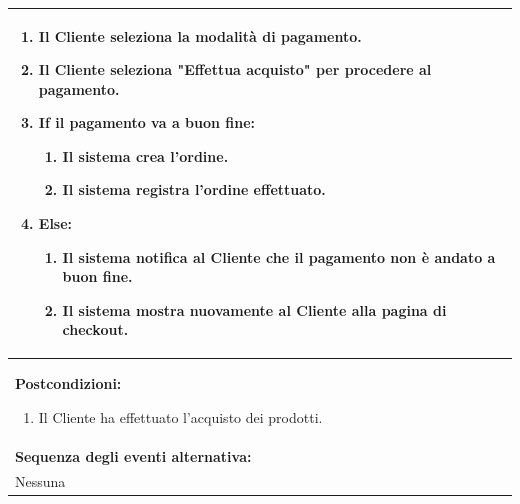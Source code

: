 \begin{center}
\begin{tabular}{ |p{12cm}| }
\begin{enumerate}[nosep, left=0pt]
        \item Il Cliente seleziona la modalità di pagamento.
        \item Il Cliente seleziona "Effettua acquisto" per procedere al pagamento.
        \item \textbf{If} il pagamento va a buon fine:
        \begin{enumerate}[nosep, left=0pt]
            \item Il sistema crea l'ordine.
            \item Il sistema registra l'ordine effettuato.
        \end{enumerate}
        \item \textbf{Else}:
        \begin{enumerate}[nosep, left=0pt]
            \item Il sistema notifica al Cliente che il pagamento non è andato a buon fine.
            \item Il sistema mostra nuovamente al Cliente alla pagina di checkout.
        \end{enumerate}
    \end{enumerate} \\
    \hline
    \textbf{Postcondizioni:}
	\begin{enumerate}[nosep, left=0pt]
    	\item Il Cliente ha effettuato l'acquisto dei prodotti.
    \end{enumerate} \\
    \hline
    \textbf{Sequenza degli eventi alternativa:} \\
    Nessuna \\
    \hline
\end{tabular}
\end{center}

\newpage
